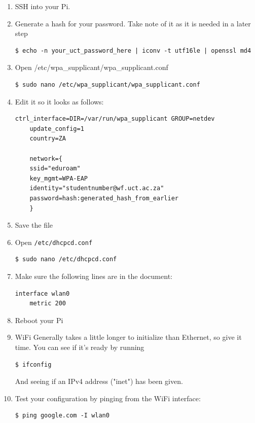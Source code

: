 \begin{enumerate}
    \item SSH into your Pi.
    \item Generate a hash for your password. Take note of it as it is needed in a later step
    \begin{lstlisting}[gobble=4]
    $ echo -n your_uct_password_here | iconv -t utf16le | openssl md4
    \end{lstlisting}
    \item Open /etc/wpa\_supplicant/wpa\_supplicant.conf
    \begin{lstlisting}[gobble=4]
    $ sudo nano /etc/wpa_supplicant/wpa_supplicant.conf
    \end{lstlisting}
    \item Edit it so it looks as follows:
    \begin{lstlisting}[gobble=4]
    ctrl_interface=DIR=/var/run/wpa_supplicant GROUP=netdev
    update_config=1
    country=ZA

    network={
    ssid="eduroam"
    key_mgmt=WPA-EAP
    identity="studentnumber@wf.uct.ac.za"
    password=hash:generated_hash_from_earlier
    }
    \end{lstlisting}
    \item Save the file 
    \item Open \verb|/etc/dhcpcd.conf|
    \begin{lstlisting}[gobble=4]
    $ sudo nano /etc/dhcpcd.conf
    \end{lstlisting}
    \item Make sure the following lines are in the document:
    \begin{lstlisting}[gobble=4]
    interface wlan0
    metric 200
    \end{lstlisting}
    \item Reboot your Pi
    \item WiFi Generally takes a little longer to initialize than Ethernet, so give it time. You can see if it's ready by running 
    \begin{lstlisting}[gobble=4]
    $ ifconfig
    \end{lstlisting}
    And seeing if an IPv4 address ("inet") has been given.
    \item Test your configuration by pinging from the WiFi interface:
    \begin{lstlisting}[gobble=4]
    $ ping google.com -I wlan0
    \end{lstlisting}
\end{enumerate}

